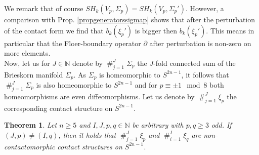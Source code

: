 \documentclass[a4paper,12pt,bibliography=totocnumbered,titlepage=false,abstracton,bookmarksnumbered=true]{scrartcl}
\DeclareMathOperator*{\consumt}{\#}
\newtheorem{theo}[defn]{Theorem}
\theoremstyle{definition}
\begin{document}
We remark that of course $SH_k(V_p,\Sigma_p)=SH_k(V_p,\Sigma_p')$. However, a comparison with Prop. \ref{propgeneratorssigmap} shows that after the perturbation of the contact form we find that $b_k(\xi_p')$ is bigger then $b_k(\xi_p')$. This means in particular that the Floer-boundary operator $\partial$ after perturbation is non-zero on more elements.\\
Now, let us for $J\in\mathbb{N}$ denote by $ \consumt_{j=1}^J \Sigma_p$ the $J$-fold connected sum of the Brieskorn manifold $\Sigma_p$. As $\Sigma_p$ is homeomorphic to $S^{2n-1}$, it follows that $ \consumt_{j=1}^J \Sigma_p$ is also homeomorphic to $S^{2n-1}$ and for $p\equiv \pm 1\mod 8$ both homeomorphisms are even diffeomorphisms. Let us denote by $\consumt_{j=1}^J \xi_p$ the corresponding contact structure on $S^{2n-1}$.
\begin{theo}\label{differentcontacttheo}
 Let $n\geq 5$ and $I,J,p,q\in\mathbb{N}$ be arbitrary with $p,q\geq 3$ odd. If $(J,p)\neq (I,q)$, then it holds that $\consumt_{j=1}^J \xi_p$ and $\consumt_{i=1}^I \xi_q$ are non-contactomorphic contact structures on $S^{2n-1}$.
\end{theo}
\end{document}
